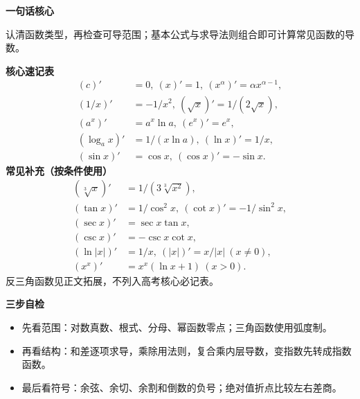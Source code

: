 \begin{summarybox}
\textbf{\textcolor{CSummary}{一句话核心}}

认清函数类型，再检查可导范围；基本公式与求导法则组合即可计算常见函数的导数。

\medskip
\textbf{\textcolor{CSummary}{核心速记表}}
\[
\begin{aligned}
(c)'&=0,\ (x)'=1,\ (x^\alpha)'=\alpha x^{\alpha-1},\\
(1/x)'&=-1/x^2,\ (\sqrt{x})'=1/(2\sqrt{x}),\\
(a^x)'&=a^x\ln a,\ (e^x)'=e^x,\\
(\log_a x)'&=1/(x\ln a),\ (\ln x)'=1/x,\\
(\sin x)'&=\cos x,\ (\cos x)'=-\sin x.
\end{aligned}
\]
\textbf{\textcolor{CSummary}{常见补充（按条件使用）}}
\[
\begin{aligned}
(\sqrt[3]x)'&=1/(3\sqrt[3]{x^2}),\\
(\tan x)'&=1/\cos^2x,\ (\cot x)'=-1/\sin^2x,\\
(\sec x)'&=\sec x\tan x,\\
(\csc x)'&=-\csc x\cot x,\\
(\ln|x|)'&=1/x,\ (|x|)'=x/|x|\ (x\ne0),\\
(x^x)'&=x^x(\ln x+1)\ (x>0).
\end{aligned}
\]
反三角函数见正文拓展，不列入高考核心必记表。

\medskip
\begin{minipage}{\linewidth}
\textbf{\textcolor{CSummary}{三步自检}}
\begin{itemize}[leftmargin=*,itemsep=0.5em,topsep=0.4em]
\item 先看范围：对数真数、根式、分母、幂函数零点；三角函数使用弧度制。
\item 再看结构：和差逐项求导，乘除用法则，复合乘内层导数，变指数先转成指数函数。
\item 最后看符号：余弦、余切、余割和倒数的负号；绝对值折点比较左右差商。
\end{itemize}
\end{minipage}
\end{summarybox}
